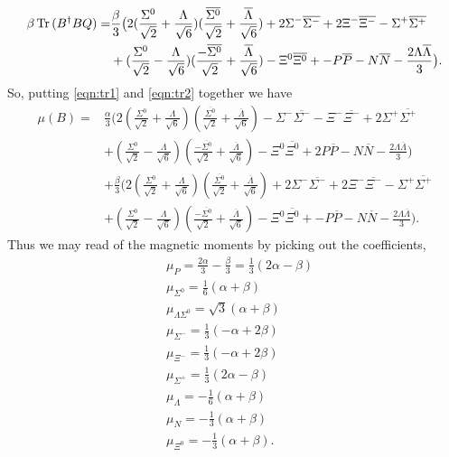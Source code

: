 \documentclass[main.tex]{subfiles}
\begin{document}
\begin{equation}\label{eqn:tr2}
\begin{split}
\beta\operatorname{Tr}{(B^{\dagger}BQ)}=&\frac{\beta}{3}\big(  2(\frac{\Sigma^0}{\sqrt{2}}+\frac{\Lambda}{\sqrt{6}})(\frac{\overline{\Sigma^0}}{\sqrt{2}}+\frac{\overline{\Lambda}}{\sqrt{6}}) +2\Sigma^-\overline{\Sigma^-}+2\Xi^-\overline{\Xi^-}-\Sigma^
+\overline{\Sigma^+}\nonumber\\& +(\frac{\Sigma^0}{\sqrt{2}}-\frac{\Lambda}{\sqrt{6}})(\frac{-\overline{\Sigma^0}}{\sqrt{2}}+\frac{\overline{\Lambda}}{\sqrt{6}})-\Xi^0\overline{\Xi^0}+-P\overline{P}-N\overline{N}-\frac{2\Lambda\overline{\Lambda}}{3}\big).
\end{split}
\end{equation}
So, putting \eqref{eqn:tr1} and \eqref{eqn:tr2} together we have
\begin{equation}
\begin{split}
\mu(B)=&\frac{\alpha}{3}\big(  2(\frac{\Sigma^0}{\sqrt{2}}+\frac{\Lambda}{\sqrt{6}})(\frac{\overline{\Sigma^0}}{\sqrt{2}}+\frac{\overline{\Lambda}}{\sqrt{6}}) -\Sigma^-\overline{\Sigma^-}-\Xi^-\overline{\Xi^-}+2\Sigma^
+\overline{\Sigma^+}\nonumber\\& +(\frac{\Sigma^0}{\sqrt{2}}-\frac{\Lambda}{\sqrt{6}})(\frac{-\overline{\Sigma^0}}{\sqrt{2}}+\frac{\overline{\Lambda}}{\sqrt{6}})-\Xi^0\overline{\Xi^0}+2P\overline{P}-N\overline{N}-\frac{2\Lambda\overline{\Lambda}}{3}\big)\nonumber\\&+\frac{\beta}{3}\big(  2(\frac{\Sigma^0}{\sqrt{2}}+\frac{\Lambda}{\sqrt{6}})(\frac{\overline{\Sigma^0}}{\sqrt{2}}+\frac{\overline{\Lambda}}{\sqrt{6}}) +2\Sigma^-\overline{\Sigma^-}+2\Xi^-\overline{\Xi^-}-\Sigma^+\overline{\Sigma^+}\nonumber\\& +(\frac{\Sigma^0}{\sqrt{2}}-\frac{\Lambda}{\sqrt{6}})(\frac{-\overline{\Sigma^0}}{\sqrt{2}}+\frac{\overline{\Lambda}}{\sqrt{6}})-\Xi^0\overline{\Xi^0}+-P\overline{P}-N\overline{N}-\frac{2\Lambda\overline{\Lambda}}{3}\big).
\end{split}
\end{equation}
Thus we may read of the magnetic moments by picking out the coefficients,
\begin{align}
&\mu_{P}=\frac{2\alpha}{3}-\frac{\beta}{3}=\frac{1}{3}(2\alpha-\beta)\\
&\mu_{\Sigma^0}=\frac{1}{6}(\alpha+\beta)\\
&\mu_{\Lambda\Sigma^0}=\sqrt{3}(\alpha+\beta)\\
&\mu_{\Sigma^-}=\frac{1}{3}(-\alpha+2\beta)\\
&\mu_{\Xi^-}=\frac{1}{3}(-\alpha+2\beta)\\
&\mu_{\Sigma^+}=\frac{1}{3}(2\alpha-\beta)\\
&\mu_{\Lambda}=-\frac{1}{6}(\alpha+\beta)\\
&\mu_{N}=-\frac{1}{3}(\alpha+\beta)\\
&\mu_{\Xi^0}=-\frac{1}{3}(\alpha+\beta).
\end{align}
\end{document}
